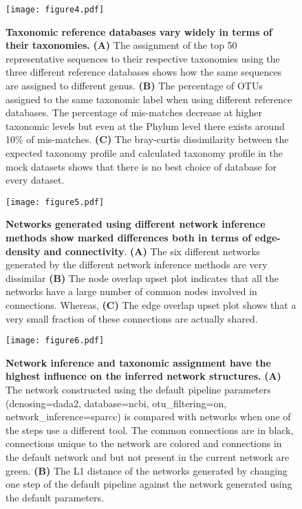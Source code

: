 \begin{figure}[h]
  \centering
  \texttt{[image: figure4.pdf]}
  \caption{
    \textbf{Taxonomic reference databases vary widely in terms of their taxonomies.}
    \textbf{(A)} The assignment of the top 50 representative sequences to their respective taxonomies using the three different reference databases shows how the same sequences are assigned to different genus.
    \textbf{(B)} The percentage of OTUs assigned to the same taxonomic label when using different reference databases.
    The percentage of mis-matches decrease at higher taxonomic levels but even at the Phylum level there exists around 10\% of mis-matches.
    \textbf{(C)} The bray-curtis dissimilarity between the expected taxonomy profile and calculated taxonomy profile in the mock datasets shows that there is no best choice of database for every dataset.
  }
  \label{fig:figure4}
\end{figure}

\begin{figure}[h]
  \centering
  \texttt{[image: figure5.pdf]}
  \caption{
    \textbf{Networks generated using different network inference methods show marked differences both in terms of edge-density and connectivity}.
    \textbf{(A)} The six different networks generated by the different network inference methods are very dissimilar
    \textbf{(B)} The node overlap upset plot indicates that all the networks have a large number of common nodes involved in connections.
    Whereas, \textbf{(C)} The edge overlap upset plot shows that a very small fraction of these connections are actually shared.
  }
  \label{fig:figure5}
\end{figure}

\begin{figure}[h]
  \centering
  \texttt{[image: figure6.pdf]}
  \caption{
    \textbf{Network inference and taxonomic assignment have the highest influence on the inferred network structures.}
    \textbf{(A)} The network constructed using the default pipeline parameters (denosing=dada2, database=ncbi, otu\_filtering=on, network\_inference=sparcc) is compared with networks when one of the steps use a different tool.
    The common connections are in black, connections unique to the network are colored and connections in the default network and but not present in the current network are green.
    \textbf{(B)} The L1 distance of the networks generated by changing one step of the default pipeline against the network generated using the default parameters.
  }
  \label{fig:figure6}
\end{figure}


